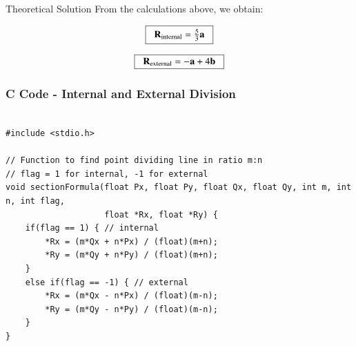 \documentclass{beamer}
\begin{document}
\begin{frame}{Theoretical Solution}
From the calculations above, we obtain:

\[
\boxed{\;\;\Large \vec{R}_{\text{internal}} = \tfrac{5}{3}\vec{a}\;\;}
\]

\[
\boxed{\;\;\Large \vec{R}_{\text{external}} = -\vec{a} + 4\vec{b}\;\;}
\]
\end{frame}
\begin{frame}[fragile]
    \frametitle{C Code - Internal and External Division}
    \begin{lstlisting}

#include <stdio.h>

// Function to find point dividing line in ratio m:n
// flag = 1 for internal, -1 for external
void sectionFormula(float Px, float Py, float Qx, float Qy, int m, int n, int flag,
                    float *Rx, float *Ry) {
    if(flag == 1) { // internal
        *Rx = (m*Qx + n*Px) / (float)(m+n);
        *Ry = (m*Qy + n*Py) / (float)(m+n);
    }
    else if(flag == -1) { // external
        *Rx = (m*Qx - n*Px) / (float)(m-n);
        *Ry = (m*Qy - n*Py) / (float)(m-n);
    }
}



    
     \end{lstlisting}
    \end{frame}
\end{document}
